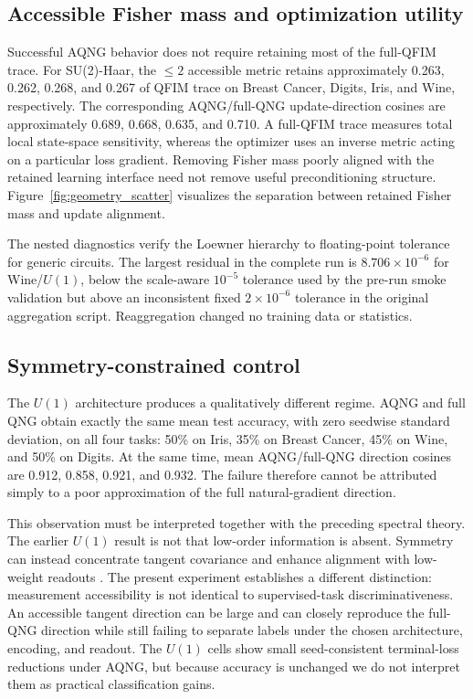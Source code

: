 \subsection{Accessible Fisher mass and optimization utility}
Successful AQNG behavior does not require retaining most of the full-QFIM trace. For SU(2)-Haar, the $\le2$ accessible metric retains approximately 0.263, 0.262, 0.268, and 0.267 of QFIM trace on Breast Cancer, Digits, Iris, and Wine, respectively. The corresponding AQNG/full-QNG update-direction cosines are approximately 0.689, 0.668, 0.635, and 0.710. A full-QFIM trace measures total local state-space sensitivity, whereas the optimizer uses an inverse metric acting on a particular loss gradient. Removing Fisher mass poorly aligned with the retained learning interface need not remove useful preconditioning structure. Figure~\ref{fig:geometry_scatter} visualizes the separation between retained Fisher mass and update alignment.

The nested diagnostics verify the Loewner hierarchy to floating-point tolerance for generic circuits. The largest residual in the complete run is $8.706\times10^{-6}$ for Wine/$U(1)$, below the scale-aware $10^{-5}$ tolerance used by the pre-run smoke validation but above an inconsistent fixed $2\times10^{-6}$ tolerance in the original aggregation script. Reaggregation changed no training data or statistics.

\subsection{Symmetry-constrained control}
The $U(1)$ architecture produces a qualitatively different regime. AQNG and full QNG obtain exactly the same mean test accuracy, with zero seedwise standard deviation, on all four tasks: 50\% on Iris, 35\% on Breast Cancer, 45\% on Wine, and 50\% on Digits. At the same time, mean AQNG/full-QNG direction cosines are 0.912, 0.858, 0.921, and 0.932. The failure therefore cannot be attributed simply to a poor approximation of the full natural-gradient direction.

This observation must be interpreted together with the preceding spectral theory. The earlier $U(1)$ result is not that low-order information is absent. Symmetry can instead concentrate tangent covariance and enhance alignment with low-weight readouts \cite{AitHaddouSpectral}. The present experiment establishes a different distinction: measurement accessibility is not identical to supervised-task discriminativeness. An accessible tangent direction can be large and can closely reproduce the full-QNG direction while still failing to separate labels under the chosen architecture, encoding, and readout. The $U(1)$ cells show small seed-consistent terminal-loss reductions under AQNG, but because accuracy is unchanged we do not interpret them as practical classification gains.

